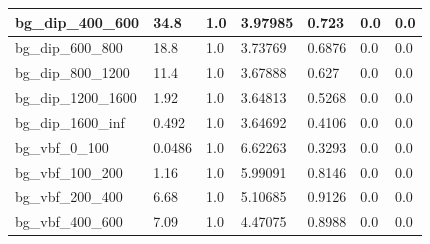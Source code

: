 \documentclass[a4paper, 10pt]{article}
\begin{document}
\begin{table}[H]
\begin{center}
\begin{tabular}{|m{23.0mm}|m{23.0mm}|m{18.0mm}|m{19.0mm}|m{19.0mm}|m{19.0mm}|m{19.0mm}|}
      \hline
      {\cellcolor{white}         bg\_dip\_400\_600}& {\cellcolor{white}         34.8}& {\cellcolor{white}         1.0}& {\cellcolor{white}         3.97985}& {\cellcolor{white}         0.723}& {\cellcolor{green}         0.0}& {\cellcolor{green}         0.0}\\
      \hline
      {\cellcolor{white}         bg\_dip\_600\_800}& {\cellcolor{white}         18.8}& {\cellcolor{white}         1.0}& {\cellcolor{white}         3.73769}& {\cellcolor{white}         0.6876}& {\cellcolor{green}         0.0}& {\cellcolor{green}         0.0}\\
      \hline
      {\cellcolor{white}         bg\_dip\_800\_1200}& {\cellcolor{white}         11.4}& {\cellcolor{white}         1.0}& {\cellcolor{white}         3.67888}& {\cellcolor{white}         0.627}& {\cellcolor{green}         0.0}& {\cellcolor{green}         0.0}\\
      \hline
      {\cellcolor{white}         bg\_dip\_1200\_1600}& {\cellcolor{white}         1.92}& {\cellcolor{white}         1.0}& {\cellcolor{white}         3.64813}& {\cellcolor{white}         0.5268}& {\cellcolor{green}         0.0}& {\cellcolor{green}         0.0}\\
      \hline
      {\cellcolor{white}         bg\_dip\_1600\_inf}& {\cellcolor{white}         0.492}& {\cellcolor{white}         1.0}& {\cellcolor{white}         3.64692}& {\cellcolor{white}         0.4106}& {\cellcolor{green}         0.0}& {\cellcolor{green}         0.0}\\
      \hline
      {\cellcolor{white}         bg\_vbf\_0\_100}& {\cellcolor{white}         0.0486}& {\cellcolor{white}         1.0}& {\cellcolor{white}         6.62263}& {\cellcolor{white}         0.3293}& {\cellcolor{green}         0.0}& {\cellcolor{green}         0.0}\\
      \hline
      {\cellcolor{white}         bg\_vbf\_100\_200}& {\cellcolor{white}         1.16}& {\cellcolor{white}         1.0}& {\cellcolor{white}         5.99091}& {\cellcolor{white}         0.8146}& {\cellcolor{green}         0.0}& {\cellcolor{green}         0.0}\\
      \hline
      {\cellcolor{white}         bg\_vbf\_200\_400}& {\cellcolor{white}         6.68}& {\cellcolor{white}         1.0}& {\cellcolor{white}         5.10685}& {\cellcolor{white}         0.9126}& {\cellcolor{green}         0.0}& {\cellcolor{green}         0.0}\\
      \hline
      {\cellcolor{white}         bg\_vbf\_400\_600}& {\cellcolor{white}         7.09}& {\cellcolor{white}         1.0}& {\cellcolor{white}         4.47075}& {\cellcolor{white}         0.8988}& {\cellcolor{green}         0.0}& {\cellcolor{green}         0.0}\\

\end{tabular}
\end{center}
\end{table}
\end{document}
